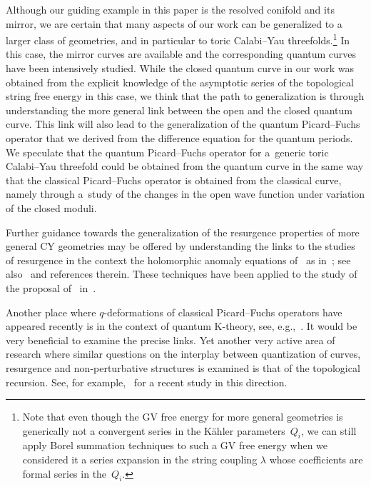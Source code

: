 \documentclass[pdftex]{sigma}
\numberwithin{equation}{section}
\begin{document}
Although our guiding example in this paper is the resolved conifold and its mirror, we are certain that many aspects of our work can be generalized to a larger class of geometries, and in particular to toric Calabi--Yau threefolds.\footnote{Note that even though the GV free energy for more general geometries is generically not a convergent series in the K\"ahler parameters~$Q_i$, we can still apply Borel summation techniques to such a GV free energy when we considered it a series expansion in the string coupling $\lambda$ whose coefficients are formal series in the~$Q_i$.} In this case, the mirror curves are available and the corresponding quantum curves have been intensively studied. While the closed quantum curve in our work was obtained from the explicit knowledge of the asymptotic series of the topological string free energy in this case, we think that the path to generalization is through understanding the more general link between the open and the closed quantum curve. This link will also lead to the generalization of the quantum Picard--Fuchs operator that we derived from the difference equation for the quantum periods. We speculate that the quantum Picard--Fuchs operator for a~generic toric Calabi--Yau threefold could be obtained from the quantum curve in the same way that the classical Picard--Fuchs operator is obtained from the classical curve, namely through a~study of the changes in the open wave function under variation of the closed moduli.

Further guidance towards the generalization of the resurgence properties of more general CY geometries may be offered by understanding the links to the studies of resurgence in the context the holomorphic anomaly equations of~\cite{Bershadsky:1993cx} as in~\cite{Couso-Santamaria:2014iia}; see also~\cite{CousoSantamaria:2014xml} and references therein.
These techniques have been applied to the study of the proposal of~\cite{GHM} in~\cite{CMS}.

Another place where $q$-deformations of classical Picard--Fuchs operators have appeared recently is in the context of quantum K-theory, see, e.g.,~\cite{Jockers:2019wjh,Jockers:2018sfl}. It would be very beneficial to examine the precise links. Yet another very active area of research where similar questions on the interplay between quantization of curves, resurgence and non-perturbative structures is examined is that of the topological recursion. See, for example,~\cite{Eynard:2021sxg} for a recent study in this direction.
\end{document}
